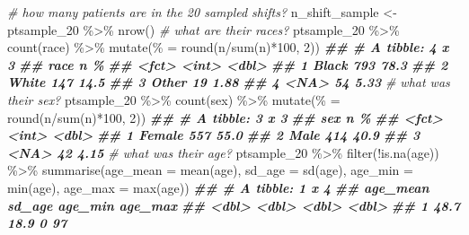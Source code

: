\documentclass[
]{article}
\newenvironment{Shaded}{\begin{snugshade}}{\end{snugshade}}
\newcommand{\AttributeTok}[1]{\textcolor[rgb]{0.77,0.63,0.00}{#1}}
\newcommand{\CommentTok}[1]{\textcolor[rgb]{0.56,0.35,0.01}{\textit{#1}}}
\newcommand{\DecValTok}[1]{\textcolor[rgb]{0.00,0.00,0.81}{#1}}
\newcommand{\DocumentationTok}[1]{\textcolor[rgb]{0.56,0.35,0.01}{\textbf{\textit{#1}}}}
\newcommand{\FunctionTok}[1]{\textcolor[rgb]{0.00,0.00,0.00}{#1}}
\newcommand{\NormalTok}[1]{#1}
\newcommand{\OtherTok}[1]{\textcolor[rgb]{0.56,0.35,0.01}{#1}}
\newcommand{\SpecialCharTok}[1]{\textcolor[rgb]{0.00,0.00,0.00}{#1}}
\newcommand{\StringTok}[1]{\textcolor[rgb]{0.31,0.60,0.02}{#1}}
\begin{document}
\begin{Shaded}
\begin{Highlighting}[]

\CommentTok{\# how many patients are in the 20 sampled shifts?}
\NormalTok{n\_shift\_sample }\OtherTok{\textless{}{-}}\NormalTok{ ptsample\_20 }\SpecialCharTok{\%\textgreater{}\%} 
  \FunctionTok{nrow}\NormalTok{()}
\CommentTok{\# what are their races?}
\NormalTok{ptsample\_20 }\SpecialCharTok{\%\textgreater{}\%} 
  \FunctionTok{count}\NormalTok{(race) }\SpecialCharTok{\%\textgreater{}\%} 
  \FunctionTok{mutate}\NormalTok{(}\StringTok{\textasciigrave{}}\AttributeTok{\%}\StringTok{\textasciigrave{}} \OtherTok{=} \FunctionTok{round}\NormalTok{(n}\SpecialCharTok{/}\FunctionTok{sum}\NormalTok{(n)}\SpecialCharTok{*}\DecValTok{100}\NormalTok{, }\DecValTok{2}\NormalTok{))}
\DocumentationTok{\#\# \# A tibble: 4 x 3}
\DocumentationTok{\#\#   race      n   \textasciigrave{}\%\textasciigrave{}}
\DocumentationTok{\#\#   \textless{}fct\textgreater{} \textless{}int\textgreater{} \textless{}dbl\textgreater{}}
\DocumentationTok{\#\# 1 Black   793 78.3 }
\DocumentationTok{\#\# 2 White   147 14.5 }
\DocumentationTok{\#\# 3 Other    19  1.88}
\DocumentationTok{\#\# 4 \textless{}NA\textgreater{}     54  5.33}
\CommentTok{\# what was their sex?}
\NormalTok{ptsample\_20 }\SpecialCharTok{\%\textgreater{}\%} 
  \FunctionTok{count}\NormalTok{(sex) }\SpecialCharTok{\%\textgreater{}\%} 
  \FunctionTok{mutate}\NormalTok{(}\StringTok{\textasciigrave{}}\AttributeTok{\%}\StringTok{\textasciigrave{}} \OtherTok{=} \FunctionTok{round}\NormalTok{(n}\SpecialCharTok{/}\FunctionTok{sum}\NormalTok{(n)}\SpecialCharTok{*}\DecValTok{100}\NormalTok{, }\DecValTok{2}\NormalTok{))}
\DocumentationTok{\#\# \# A tibble: 3 x 3}
\DocumentationTok{\#\#   sex        n   \textasciigrave{}\%\textasciigrave{}}
\DocumentationTok{\#\#   \textless{}fct\textgreater{}  \textless{}int\textgreater{} \textless{}dbl\textgreater{}}
\DocumentationTok{\#\# 1 Female   557 55.0 }
\DocumentationTok{\#\# 2 Male     414 40.9 }
\DocumentationTok{\#\# 3 \textless{}NA\textgreater{}      42  4.15}
\CommentTok{\# what was their age?}
\NormalTok{ptsample\_20 }\SpecialCharTok{\%\textgreater{}\%} 
  \FunctionTok{filter}\NormalTok{(}\SpecialCharTok{!}\FunctionTok{is.na}\NormalTok{(age)) }\SpecialCharTok{\%\textgreater{}\%} 
  \FunctionTok{summarise}\NormalTok{(}\AttributeTok{age\_mean =} \FunctionTok{mean}\NormalTok{(age), }
            \AttributeTok{sd\_age =} \FunctionTok{sd}\NormalTok{(age),}
            \AttributeTok{age\_min =} \FunctionTok{min}\NormalTok{(age), }
            \AttributeTok{age\_max =} \FunctionTok{max}\NormalTok{(age))}
\DocumentationTok{\#\# \# A tibble: 1 x 4}
\DocumentationTok{\#\#   age\_mean sd\_age age\_min age\_max}
\DocumentationTok{\#\#      \textless{}dbl\textgreater{}  \textless{}dbl\textgreater{}   \textless{}dbl\textgreater{}   \textless{}dbl\textgreater{}}
\DocumentationTok{\#\# 1     48.7   18.9       0      97}
\end{Highlighting}
\end{Shaded}
\end{document}
